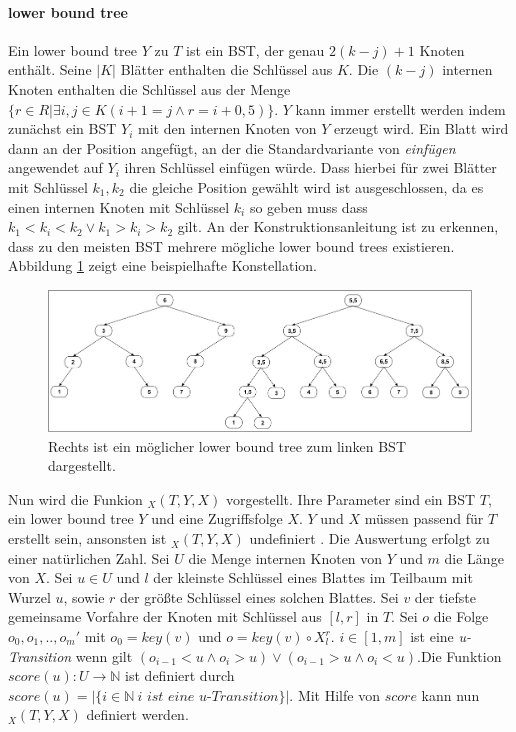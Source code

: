 \documentclass[a4paper,12pt]{article}
\begin{document}
\paragraph{lower bound tree} \label{wilberLowerBoundTree}
Ein lower bound tree $Y$ zu $T$ ist ein BST, der genau $2 \left(k - j \right) + 1$ Knoten enthält. Seine $\vert K \vert$ Blätter enthalten die Schlüssel aus $K$. Die $\left(k - j \right)$ internen Knoten enthalten die Schlüssel aus der Menge $\{r \in R \vert \exists i,j \in K \left( i + 1 = j \land r = i + 0,5\right)\}$. $Y$ kann immer erstellt werden indem zunächst ein BST $Y_i$ mit den internen Knoten von $Y$ erzeugt wird. Ein Blatt wird dann an der Position angefügt, an der die Standardvariante von \textit{einfügen} angewendet auf $Y_i$ ihren Schlüssel einfügen würde. Dass hierbei für zwei Blätter mit Schlüssel $k_1, k_2$ die gleiche Position gewählt wird ist ausgeschlossen, da es einen internen Knoten mit Schlüssel $k_i$ so geben muss dass $k_1 < k_i < k_2 \lor k_1 > k_i > k_2 $ gilt. An der Konstruktionsanleitung ist zu erkennen, dass zu den meisten BST mehrere mögliche lower bound trees existieren. Abbildung \ref{fig:lowerBoundTree} zeigt eine beispielhafte Konstellation. \\


        
\begin{figure}[h]
	\centering
	\includegraphics[width=1\textwidth]{"Medien/DynOpt/lowerBoundTree"}
	\caption{Rechts ist ein möglicher lower bound tree zum linken BST dargestellt.  }
	\label{fig:lowerBoundTree}
\end{figure}

\noindent Nun wird die Funkion $_X(T, Y, X) $ vorgestellt. Ihre Parameter sind ein BST $T$, ein lower bound tree $Y$ und eine Zugriffsfolge $X$. $Y$ und $X$ müssen passend für $T$ erstellt sein, ansonsten ist $_X(T, Y, X) $ undefiniert . Die Auswertung erfolgt zu einer natürlichen Zahl. Sei $U$ die Menge internen Knoten von $Y$ und $m$ die Länge von $X$. Sei $u \in U$ und $l$ der kleinste Schlüssel eines Blattes im Teilbaum mit Wurzel $u$, sowie $r$ der größte Schlüssel eines solchen Blattes. Sei $v$ der tiefste gemeinsame Vorfahre der Knoten mit Schlüssel aus $\left[l, r\right]$  in $T$. Sei $o$ die Folge $o_0, o_1,..,o_m'$ mit $o_0 = \mathit{key}(v)$ und $o = \mathit{key}(v) \circ X^r_l$. $i \in \left[1,m\right]$ ist eine \textit{u-Transition} wenn gilt $\left( o_{i-1} < u \land o_i > u \right) \lor \left( o_{i-1} > u \land o_i < u \right)$.Die Funktion $\mathit{score}\left(u\right) \colon U \rightarrow \mathbb{N}$ ist definiert durch $\mathit{score}\left(u\right) = \vert\{i \in \mathbb{N}\ \textit{i ist eine u-Transition}\} \vert$. Mit Hilfe von $\mathit{score}$ kann nun  $_X(T, Y, X) $ definiert werden.
\end{document}
